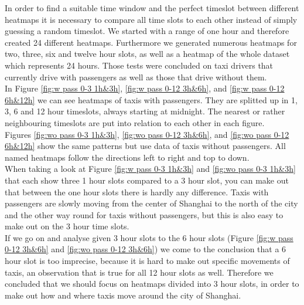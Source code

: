 \documentclass[11pt,conference,a4paper,twocolumns,romanappendices]{IEEEtran}
\begin{document}
In order to find a suitable time window and the perfect timeslot between different heatmaps it is necessary to compare all time slots to each other instead of simply guessing a random timeslot. We started with a range of one hour and therefore created 24 different heatmaps. Furthermore we generated numerous heatmaps for two, three, six and twelve hour slots, as well as a heatmap of the whole dataset which represents 24 hours. Those tests were concluded on taxi drivers that currently drive with passengers as well as those that drive without them.\\

In Figure \ref{fig:w pass 0-3 1h&3h}, \ref{fig:w pass 0-12 3h&6h}, and \ref{fig:w pass 0-12 6h&12h} we can see heatmaps of taxis with passengers. They are splitted up in 1, 3, 6 and 12 hour timeslots, always starting at midnight. The nearest or rather neighbouring timeslots are put into relation to each other in each figure.\\
Figures \ref{fig:wo pass 0-3 1h&3h}, \ref{fig:wo pass 0-12 3h&6h}, and \ref{fig:wo pass 0-12 6h&12h} show the same patterns but use data of taxis without passengers.
All named heatmaps follow the directions left to right and top to down.\\

When taking a look at Figure \ref{fig:w pass 0-3 1h&3h} and \ref{fig:wo pass 0-3 1h&3h} that each show three 1 hour slots compared to a 3 hour slot, you can make out that between the one hour slots there is hardly any difference. Taxis with passengers are slowly moving from the center of Shanghai to the north of the city and the other way round for taxis without passengers, but this is also easy to make out on the 3 hour time slots.\\
If we go on and analyse given 3 hour slots to the 6 hour slots (Figure \ref{fig:w pass 0-12 3h&6h} and \ref{fig:wo pass 0-12 3h&6h}) we come to the conclusion that a 6 hour slot is too imprecise, because it is hard to make out specific movements of taxis, an observation that is true for all 12 hour slots as well. Therefore we concluded that we should focus on heatmaps divided into 3 hour slots, in order to make out how and where taxis move around the city of Shanghai.
\end{document}
